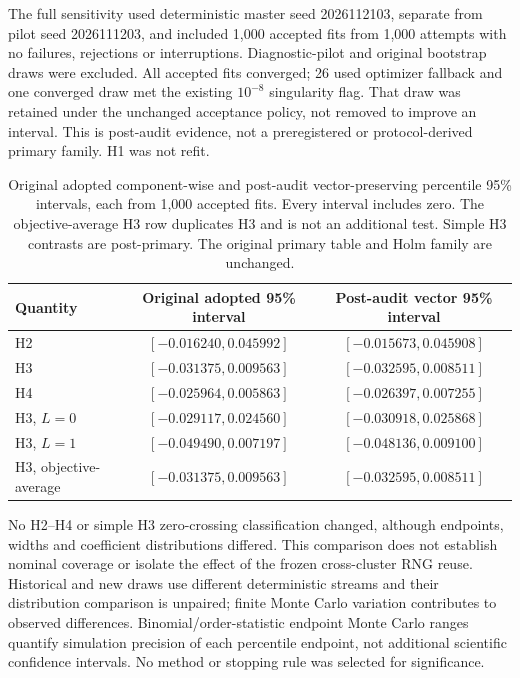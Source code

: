 \documentclass[pdflatex,sn-basic,Numbered]{sn-jnl}
\begin{document}
The full sensitivity used deterministic master seed 2026112103, separate from pilot seed 2026111203, and included 1,000 accepted fits from 1,000 attempts with no failures, rejections or interruptions. Diagnostic-pilot and original bootstrap draws were excluded. All accepted fits converged; 26 used optimizer fallback and one converged draw met the existing $10^{-8}$ singularity flag. That draw was retained under the unchanged acceptance policy, not removed to improve an interval. This is post-audit evidence, not a preregistered or protocol-derived primary family. H1 was not refit.

\begin{table}[t]\centering\small
\begin{tabular}{lcc}
\toprule
Quantity & Original adopted 95\% interval & Post-audit vector 95\% interval \\
\midrule
H2 & $[-0.016240,0.045992]$ & $[-0.015673,0.045908]$ \\
H3 & $[-0.031375,0.009563]$ & $[-0.032595,0.008511]$ \\
H4 & $[-0.025964,0.005863]$ & $[-0.026397,0.007255]$ \\
H3, $L=0$ & $[-0.029117,0.024560]$ & $[-0.030918,0.025868]$ \\
H3, $L=1$ & $[-0.049490,0.007197]$ & $[-0.048136,0.009100]$ \\
H3, objective-average & $[-0.031375,0.009563]$ & $[-0.032595,0.008511]$ \\
\bottomrule
\end{tabular}
\caption{Original adopted component-wise and post-audit vector-preserving percentile 95\% intervals, each from 1,000 accepted fits. Every interval includes zero. The objective-average H3 row duplicates H3 and is not an additional test. Simple H3 contrasts are post-primary. The original primary table and Holm family are unchanged.}
\label{supp:tab:vector-bootstrap}
\end{table}

No H2--H4 or simple H3 zero-crossing classification changed, although endpoints, widths and coefficient distributions differed. This comparison does not establish nominal coverage or isolate the effect of the frozen cross-cluster RNG reuse. Historical and new draws use different deterministic streams and their distribution comparison is unpaired; finite Monte Carlo variation contributes to observed differences. Binomial/order-statistic endpoint Monte Carlo ranges quantify simulation precision of each percentile endpoint, not additional scientific confidence intervals. No method or stopping rule was selected for significance.
\end{document}

